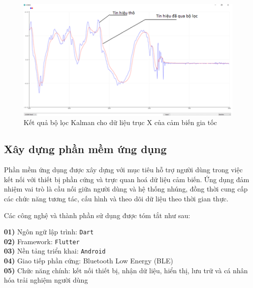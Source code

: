 \begin{figure}[htbp]
    \centering
    \includegraphics[width=\textwidth]{images/kalman.png}
    \caption{Kết quả bộ lọc Kalman cho dữ liệu trục X của cảm biến gia tốc}
    \label{kalman}
\end{figure}





\subsection{Xây dựng phần mềm ứng dụng}

Phần mềm ứng dụng được xây dựng với mục tiêu hỗ trợ người dùng trong việc 
kết nối với thiết bị phần cứng và trực quan hoá dữ liệu cảm biến. 
Ứng dụng đảm nhiệm vai trò là cầu nối giữa người dùng và hệ thống nhúng, 
đồng thời cung cấp các chức năng tương tác, cấu hình và theo dõi dữ liệu 
theo thời gian thực.

Các công nghệ và thành phần sử dụng được tóm tắt như sau:

\begin{flushleft}
\textbf{01)} Ngôn ngữ lập trình: \texttt{Dart} \\
\textbf{02)} Framework: \texttt{Flutter} \\
\textbf{03)} Nền tảng triển khai: \texttt{Android} \\
\textbf{04)} Giao tiếp phần cứng: Bluetooth Low Energy (BLE) \\
\textbf{05)} Chức năng chính: kết nối thiết bị, nhận dữ liệu, hiển thị, lưu trữ và cá nhân hóa trải nghiệm người dùng
\end{flushleft}

